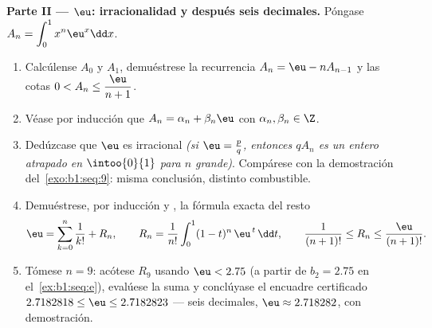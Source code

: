 \begin{problem}
\medskip
\noindent\textbf{Parte II --- $\eu$: irracionalidad y después seis
decimales.} Póngase $A_n = \displaystyle\int_0^1 x^n \eu^x \dd x$.
\begin{enumerate}[resume]
  \item Calcúlense $A_0$ y $A_1$, demuéstrese la recurrencia
        $A_n = \eu - n A_{n-1}$ y las cotas
        $0 < A_n \leq \dfrac{\eu}{n+1}$.
  \item Véase por inducción que $A_n = \alpha_n + \beta_n \eu$ con
        $\alpha_n, \beta_n \in \Z$.
  \item Dedúzcase que $\eu$ es irracional \emph{(si $\eu = \frac
        pq$, entonces $q A_n$ es un entero atrapado en
        $\intoo{0}{1}$ para $n$ grande)}. Compárese con la
        demostración del~\cref{exo:b1:seq:9}: misma conclusión,
        distinto combustible.
  \item Demuéstrese, por inducción y , la
        fórmula exacta del resto
        \[
        \eu = \sum_{k=0}^{n} \frac{1}{k!} + R_n,
        \qquad
        R_n = \frac{1}{n!}\int_0^1 (1 - t)^n\,\eu^{\,t}\,\dd t,
        \qquad
        \frac{1}{(n+1)!} \leq R_n \leq \frac{\eu}{(n+1)!} .
        \]
  \item Tómese $n = 9$: acótese $R_9$ usando $\eu < 2.75$ (a partir
        de $b_2 = 2.75$ en el~\cref{ex:b1:seq:e}), evalúese la suma y
        conclúyase el encuadre certificado
        $2.7182818 \leq \eu \leq 2.7182823$ --- seis decimales,
        $\eu \approx 2.718282$, con demostración.
\end{enumerate}


\end{problem}

